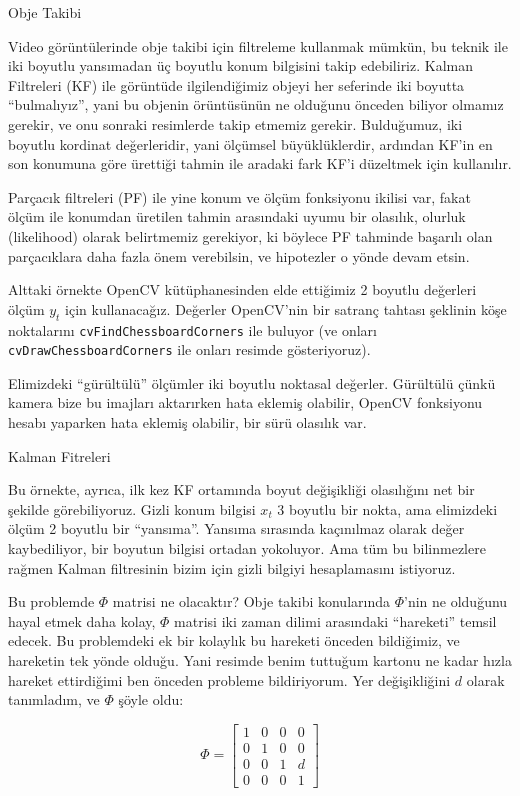\documentclass[12pt,fleqn]{article}\usepackage{../../common}
\begin{document}
Obje Takibi

Video görüntülerinde obje takibi için filtreleme kullanmak mümkün, bu
teknik ile iki boyutlu yansımadan üç boyutlu konum bilgisini takip
edebiliriz. Kalman Filtreleri (KF) ile görüntüde ilgilendiğimiz objeyi her
seferinde iki boyutta ``bulmalıyız'', yani bu objenin örüntüsünün ne
olduğunu önceden biliyor olmamız gerekir, ve onu sonraki resimlerde takip
etmemiz gerekir. Bulduğumuz, iki boyutlu kordinat değerleridir, yani
ölçümsel büyüklüklerdir, ardından KF'in en son konumuna göre ürettiği
tahmin ile aradaki fark KF'i düzeltmek için kullanılır.

Parçacık filtreleri (PF) ile yine konum ve ölçüm fonksiyonu ikilisi var,
fakat ölçüm ile konumdan üretilen tahmin arasındaki uyumu bir olasılık,
olurluk (likelihood) olarak belirtmemiz gerekiyor, ki böylece PF tahminde
başarılı olan parçacıklara daha fazla önem verebilsin, ve hipotezler o
yönde devam etsin. 

Alttaki örnekte OpenCV kütüphanesinden elde ettiğimiz 2 boyutlu değerleri
ölçüm $y_t$ için kullanacağız. Değerler OpenCV'nin bir satranç tahtası
şeklinin köşe noktalarını \verb!cvFindChessboardCorners! ile buluyor (ve
onları \verb!cvDrawChessboardCorners! ile onları resimde gösteriyoruz).

Elimizdeki ``gürültülü'' ölçümler iki boyutlu noktasal değerler. Gürültülü çünkü
kamera bize bu imajları aktarırken hata eklemiş olabilir, OpenCV fonksiyonu
hesabı yaparken hata eklemiş olabilir, bir sürü olasılık var.

Kalman Fitreleri

Bu örnekte, ayrıca, ilk kez KF ortamında boyut değişikliği olasılığını net bir
şekilde görebiliyoruz. Gizli konum bilgisi $x_t$ 3 boyutlu bir nokta, ama
elimizdeki ölçüm 2 boyutlu bir ``yansıma''. Yansıma sırasında kaçınılmaz olarak
değer kaybediliyor, bir boyutun bilgisi ortadan yokoluyor. Ama tüm bu
bilinmezlere rağmen Kalman filtresinin bizim için gizli bilgiyi hesaplamasını
istiyoruz.

Bu problemde $\Phi$ matrisi ne olacaktır? Obje takibi konularında $\Phi$'nin ne
olduğunu hayal etmek daha kolay, $\Phi$ matrisi iki zaman dilimi arasındaki
``hareketi'' temsil edecek. Bu problemdeki ek bir kolaylık bu hareketi önceden
bildiğimiz, ve hareketin tek yönde olduğu. Yani resimde benim tuttuğum kartonu
ne kadar hızla hareket ettirdiğimi ben önceden probleme bildiriyorum. Yer
değişikliğini $d$ olarak tanımladım, ve $\Phi$ şöyle oldu:

$$ 
\Phi = 
\left[\begin{array}{rrrr}
1 & 0 & 0 & 0 \\
0 & 1 & 0 & 0 \\
0 & 0 & 1 & d \\
0 & 0 & 0 & 1
\end{array}\right]
$$
\end{document}
